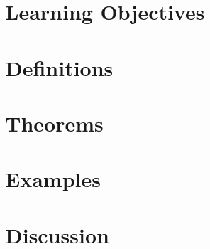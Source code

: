 \section{Learning Objectives}

\section{Definitions}

\section{Theorems}

\section{Examples}

\section{Discussion}
